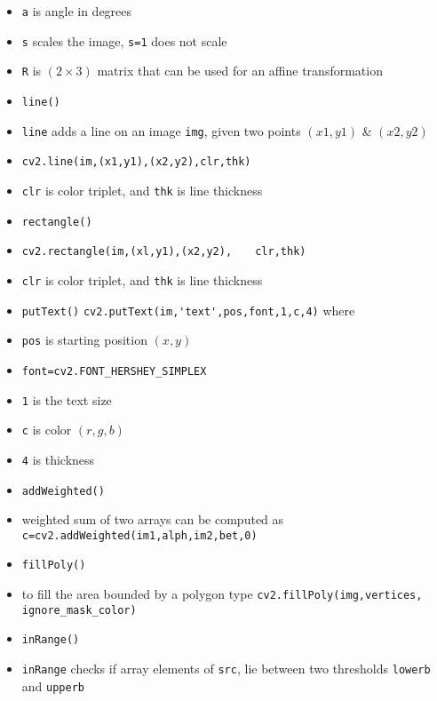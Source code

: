 \documentclass[onecolumn]{IEEEtran} %
\begin{document}
\begin{itemize}
        \item \verb|a| is angle in degrees
        \item \verb|s| scales the image, \verb|s=1| does not scale
        \item \verb|R| is $(2 \times 3)$ matrix that can be used for an affine transformation
    \ei
    \item \verb|line()|
    \bi
        \item \verb|line| adds a line on an image \verb|img|, given two points $(x1,y1)$ \& $(x2,y2)$
        \item \verb|cv2.line(im,(x1,y1),(x2,y2),clr,thk)|
        \item \verb|clr| is color triplet, and \verb|thk| is line thickness
    \ei
    \item \verb|rectangle()|
    \bi
        \item \verb|cv2.rectangle(im,(xl,y1),(x2,y2),| \newline
        \verb|   clr,thk)|
        \item \verb|clr| is color triplet, and \verb|thk| is line thickness
    \ei
    \item \verb|putText()|
    \newline
    \verb|cv2.putText(im,'text',pos,font,1,c,4)| where
    \bi
        \item \verb|pos| is starting position $(x,y)$
        \item \verb|font=cv2.FONT_HERSHEY_SIMPLEX|
        \item \verb|1| is the text size
        \item \verb|c| is color $(r, g, b)$
        \item \verb|4| is thickness
    \ei
    \item \verb|addWeighted()|
    \bi
        \item weighted sum of two arrays can be computed as \newline
        \verb|c=cv2.addWeighted(im1,alph,im2,bet,0)|
    \ei
    \item \verb|fillPoly()|
    \bi
        \item to fill the area bounded by a polygon type\newline
        \verb|cv2.fillPoly(img,vertices,| \newline
            \verb|    ignore_mask_color)|
    \ei
    \item \verb|inRange()|
    \bi
        \item \verb|inRange| checks if array elements of \verb|src|, lie between two thresholds \verb|lowerb| and \verb|upperb| \newline

\end{itemize}
\end{document}
